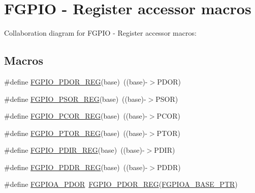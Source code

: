 \hypertarget{group___f_g_p_i_o___register___accessor___macros}{}\section{F\+G\+P\+IO -\/ Register accessor macros}
\label{group___f_g_p_i_o___register___accessor___macros}
Collaboration diagram for F\+G\+P\+IO -\/ Register accessor macros\+:
\subsection*{Macros}
\begin{DoxyCompactItemize}
\item 
\#define \hyperlink{group___f_g_p_i_o___register___accessor___macros_gacc864141de88d48cc2bcfeb7e7561355}{F\+G\+P\+I\+O\+\_\+\+P\+D\+O\+R\+\_\+\+R\+EG}(base)~((base)-\/$>$P\+D\+OR)
\item 
\#define \hyperlink{group___f_g_p_i_o___register___accessor___macros_ga54a29c014c762391371b2f8dce53a89d}{F\+G\+P\+I\+O\+\_\+\+P\+S\+O\+R\+\_\+\+R\+EG}(base)~((base)-\/$>$P\+S\+OR)
\item 
\#define \hyperlink{group___f_g_p_i_o___register___accessor___macros_gafc8a737aad6f10b837eea247f548c2c9}{F\+G\+P\+I\+O\+\_\+\+P\+C\+O\+R\+\_\+\+R\+EG}(base)~((base)-\/$>$P\+C\+OR)
\item 
\#define \hyperlink{group___f_g_p_i_o___register___accessor___macros_ga437196d610550fb3c534d267d06199b8}{F\+G\+P\+I\+O\+\_\+\+P\+T\+O\+R\+\_\+\+R\+EG}(base)~((base)-\/$>$P\+T\+OR)
\item 
\#define \hyperlink{group___f_g_p_i_o___register___accessor___macros_gacfddb4a1de217cf1491c5dd88fca546a}{F\+G\+P\+I\+O\+\_\+\+P\+D\+I\+R\+\_\+\+R\+EG}(base)~((base)-\/$>$P\+D\+IR)
\item 
\#define \hyperlink{group___f_g_p_i_o___register___accessor___macros_gab7e22aa4413933045d874108bdf09478}{F\+G\+P\+I\+O\+\_\+\+P\+D\+D\+R\+\_\+\+R\+EG}(base)~((base)-\/$>$P\+D\+DR)
\item 
\#define \hyperlink{group___f_g_p_i_o___register___accessor___macros_gae9758c811074785f7b017f89828ffa84}{F\+G\+P\+I\+O\+A\+\_\+\+P\+D\+OR}~\hyperlink{group___f_g_p_i_o___register___accessor___macros_gacc864141de88d48cc2bcfeb7e7561355}{F\+G\+P\+I\+O\+\_\+\+P\+D\+O\+R\+\_\+\+R\+EG}(\hyperlink{group___f_g_p_i_o___peripheral_gab3a191da68ebf432fd4f94966600d287}{F\+G\+P\+I\+O\+A\+\_\+\+B\+A\+S\+E\+\_\+\+P\+TR})
\item 

\end{DoxyCompactItemize}
